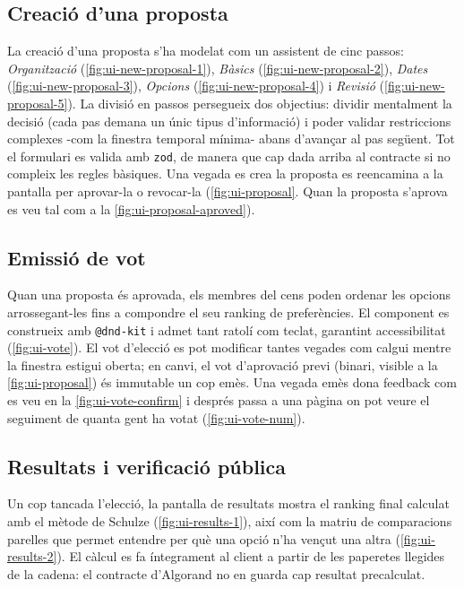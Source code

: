 \subsection{Creació d'una proposta}
\label{subsec:creacio-d'una-proposta}

La creació d'una proposta s'ha modelat com un assistent de cinc passos: \textit{Organització}
(\ref{fig:ui-new-proposal-1}), \textit{Bàsics} (\ref{fig:ui-new-proposal-2}), \textit{Dates}
(\ref{fig:ui-new-proposal-3}), \textit{Opcions} (\ref{fig:ui-new-proposal-4}) i \textit{Revisió}
(\ref{fig:ui-new-proposal-5}).
La divisió en passos persegueix dos objectius: dividir mentalment la decisió (cada pas demana un únic tipus
d'informació) i poder validar restriccions complexes -com la finestra temporal mínima- abans d'avançar al pas següent.
Tot el formulari es valida amb \texttt{zod}, de manera que cap dada arriba al contracte si no compleix les regles
bàsiques.
Una vegada es crea la proposta es reencamina a la pantalla per aprovar-la o revocar-la (\autoref{fig:ui-proposal}.
Quan la proposta s'aprova es veu tal com a la \autoref{fig:ui-proposal-aproved}).

\subsection{Emissió de vot}
\label{subsec:emissio-de-vot}

Quan una proposta és aprovada, els membres del cens poden ordenar les opcions arrossegant-les fins a compondre el seu
ranking de preferències.
El component es construeix amb \texttt{@dnd-kit} i admet tant ratolí com teclat, garantint accessibilitat
(\autoref{fig:ui-vote}).
El vot d'elecció es pot modificar tantes vegades com calgui mentre la finestra estigui oberta; en canvi, el vot
d'aprovació previ (binari, visible a la \autoref{fig:ui-proposal}) és immutable un cop emès.
Una vegada emès dona feedback com es veu en la \autoref{fig:ui-vote-confirm} i després passa a una pàgina on pot veure
el seguiment de quanta gent ha votat (\autoref{fig:ui-vote-num}).

\subsection{Resultats i verificació pública}
\label{subsec:resultats-i-verificacio-publica}

Un cop tancada l'elecció, la pantalla de resultats mostra el ranking final calculat amb el mètode de Schulze
(\autoref{fig:ui-results-1}), així com la matriu de comparacions parelles que permet entendre per què una opció n'ha
vençut una altra (\autoref{fig:ui-results-2}).
El càlcul es fa íntegrament al client a partir de les paperetes llegides de la cadena: el contracte d'Algorand no en
guarda cap resultat precalculat.

